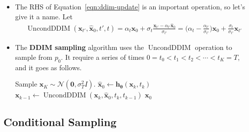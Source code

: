 \documentclass[10pt]{article}
\newcommand{\ve}[1]{\mathbf{#1}}
\newcommand{\ves}[1]{\boldsymbol{#1}}
\newcommand{\mcal}[1]{\mathcal{#1}}
\begin{document}
\begin{itemize}
  \item The RHS of Equation~\eqref{eqn:ddim-update} is an important operation, so let's give it a name. Let
  \begin{align*}
    \operatorname{UncondDDIM}(\ve{x}_{t'}, \hat{\ve{x}}_0, t', t) 
    = \alpha_t \hat{\ve{x}}_0 + \sigma_t \frac{\ve{x}_{t'} - \alpha_{t'}\hat{\ve{x}}_0}{\sigma_{t'}}
    = \bigg( \alpha_t - \frac{\alpha_{t'}}{\sigma_{t'}} \bigg) \hat{\ve{x}}_0 + \frac{\sigma_t}{\sigma_{t'}}\ve{x}_{t'}
  \end{align*}

  \item The \textbf{DDIM sampling} algorithm uses the $\operatorname{UncondDDIM}$ operation to sample from $p_0$. It require a series of times $0 = t_0 < t_1 < t_2 < \dotsb < t_K = T$, and it goes as follows.
  
  \begin{algorithmic}[1]
    \State Sample $\ve{x}_{K} \sim \mcal{N}(\ve{0}, \sigma_T^2I)$.
      \State $\hat{\ve{x}}_0 \gets \ve{h}_{\ves{\theta}}(\ve{x}_k, t_{k})$
      \State $\ve{x}_{k-1} \gets \operatorname{UncondDDIM}(\ve{x}_k, \hat{\ve{x}}_0, t_{k}, t_{k-1})$
    \EndFor
    \State \Return $\ve{x}_0$
  \end{algorithmic}
\end{itemize}

\subsection{Conditional Sampling}
\end{document}
